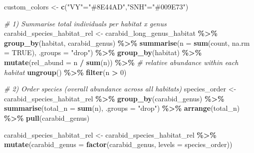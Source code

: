 \documentclass[
]{article}
\newenvironment{Shaded}{\begin{snugshade}}{\end{snugshade}}
\newcommand{\AttributeTok}[1]{\textcolor[rgb]{0.13,0.29,0.53}{#1}}
\newcommand{\CommentTok}[1]{\textcolor[rgb]{0.56,0.35,0.01}{\textit{#1}}}
\newcommand{\ConstantTok}[1]{\textcolor[rgb]{0.56,0.35,0.01}{#1}}
\newcommand{\DecValTok}[1]{\textcolor[rgb]{0.00,0.00,0.81}{#1}}
\newcommand{\FunctionTok}[1]{\textcolor[rgb]{0.13,0.29,0.53}{\textbf{#1}}}
\newcommand{\NormalTok}[1]{#1}
\newcommand{\OtherTok}[1]{\textcolor[rgb]{0.56,0.35,0.01}{#1}}
\newcommand{\SpecialCharTok}[1]{\textcolor[rgb]{0.81,0.36,0.00}{\textbf{#1}}}
\newcommand{\StringTok}[1]{\textcolor[rgb]{0.31,0.60,0.02}{#1}}
\begin{document}
\begin{Shaded}
\begin{Highlighting}[]
\NormalTok{custom\_colors }\OtherTok{\textless{}{-}} \FunctionTok{c}\NormalTok{(}\StringTok{"VY"}\OtherTok{=}\StringTok{"\#8E44AD"}\NormalTok{,}\StringTok{"SNH"}\OtherTok{=}\StringTok{"\#009E73"}\NormalTok{)}

\CommentTok{\# 1) Summarise total individuals per habitat x genus}
\NormalTok{carabid\_species\_habitat\_rel }\OtherTok{\textless{}{-}}\NormalTok{ carabid\_long\_genus\_habitat }\SpecialCharTok{\%\textgreater{}\%}
  \FunctionTok{group\_by}\NormalTok{(habitat, carabid\_genus) }\SpecialCharTok{\%\textgreater{}\%}
  \FunctionTok{summarise}\NormalTok{(}\AttributeTok{n =} \FunctionTok{sum}\NormalTok{(count, }\AttributeTok{na.rm =} \ConstantTok{TRUE}\NormalTok{), }\AttributeTok{.groups =} \StringTok{"drop"}\NormalTok{) }\SpecialCharTok{\%\textgreater{}\%}
  \FunctionTok{group\_by}\NormalTok{(habitat) }\SpecialCharTok{\%\textgreater{}\%}
  \FunctionTok{mutate}\NormalTok{(}\AttributeTok{rel\_abund =}\NormalTok{ n }\SpecialCharTok{/} \FunctionTok{sum}\NormalTok{(n)) }\SpecialCharTok{\%\textgreater{}\%}   \CommentTok{\# relative abundance within each habitat}
  \FunctionTok{ungroup}\NormalTok{() }\SpecialCharTok{\%\textgreater{}\%}
  \FunctionTok{filter}\NormalTok{(n }\SpecialCharTok{\textgreater{}} \DecValTok{0}\NormalTok{)}

\CommentTok{\# 2) Order species (overall abundance across all habitats)}
\NormalTok{species\_order }\OtherTok{\textless{}{-}}\NormalTok{ carabid\_species\_habitat\_rel }\SpecialCharTok{\%\textgreater{}\%}
  \FunctionTok{group\_by}\NormalTok{(carabid\_genus) }\SpecialCharTok{\%\textgreater{}\%}
  \FunctionTok{summarise}\NormalTok{(}\AttributeTok{total\_n =} \FunctionTok{sum}\NormalTok{(n), }\AttributeTok{.groups =} \StringTok{"drop"}\NormalTok{) }\SpecialCharTok{\%\textgreater{}\%}
  \FunctionTok{arrange}\NormalTok{(total\_n) }\SpecialCharTok{\%\textgreater{}\%}
  \FunctionTok{pull}\NormalTok{(carabid\_genus)}

\NormalTok{carabid\_species\_habitat\_rel }\OtherTok{\textless{}{-}}\NormalTok{ carabid\_species\_habitat\_rel }\SpecialCharTok{\%\textgreater{}\%}
  \FunctionTok{mutate}\NormalTok{(}\AttributeTok{carabid\_genus =} \FunctionTok{factor}\NormalTok{(carabid\_genus, }\AttributeTok{levels =}\NormalTok{ species\_order))}


\end{Highlighting}
\end{Shaded}
\end{document}
